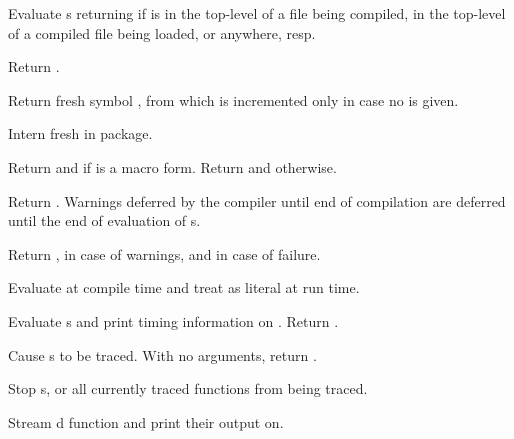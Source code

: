 \begin{LIST}{1cm}
  Evaluate s returning
   if  is in the
  top-level of a file being compiled, in the top-level of a compiled file being
  loaded, or anywhere, resp.

  Return .

  Return fresh symbol ,  from
   which is incremented only in case no  is given.

  Intern fresh  in package.

  Return  and \retval{\T} if
   is a macro form. 
  Return  and \retval{\NIL} otherwise.

  Return . Warnings deferred by the
  compiler until end of compilation are deferred until the end of
  evaluation of s. 

  Return  , \retvalii{\T} in case
  of warnings, and \retvaliii{\T} in case of failure.

  Evaluate  at compile time and treat  as literal
  at run time.

  Evaluate s and print timing information on .
  Return .
  
  Cause s to be traced. With no arguments,
  return .

  Stop s, or all currently traced functions from being traced.

  Stream d function and  print their output on.
  


\end{LIST}
